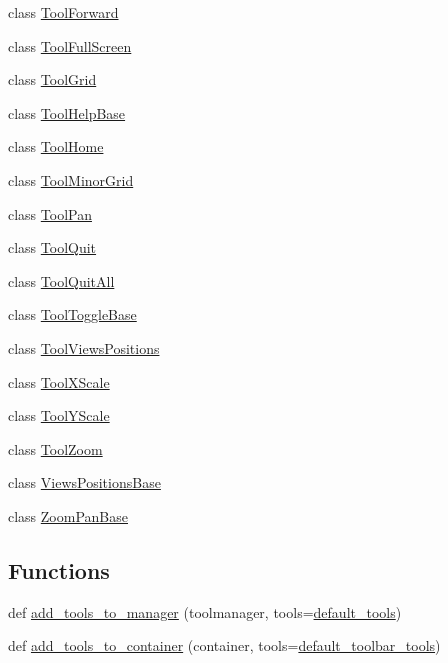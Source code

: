 \begin{DoxyCompactItemize}
\item 
class \hyperlink{classmatplotlib_1_1backend__tools_1_1ToolForward}{Tool\+Forward}
\item 
class \hyperlink{classmatplotlib_1_1backend__tools_1_1ToolFullScreen}{Tool\+Full\+Screen}
\item 
class \hyperlink{classmatplotlib_1_1backend__tools_1_1ToolGrid}{Tool\+Grid}
\item 
class \hyperlink{classmatplotlib_1_1backend__tools_1_1ToolHelpBase}{Tool\+Help\+Base}
\item 
class \hyperlink{classmatplotlib_1_1backend__tools_1_1ToolHome}{Tool\+Home}
\item 
class \hyperlink{classmatplotlib_1_1backend__tools_1_1ToolMinorGrid}{Tool\+Minor\+Grid}
\item 
class \hyperlink{classmatplotlib_1_1backend__tools_1_1ToolPan}{Tool\+Pan}
\item 
class \hyperlink{classmatplotlib_1_1backend__tools_1_1ToolQuit}{Tool\+Quit}
\item 
class \hyperlink{classmatplotlib_1_1backend__tools_1_1ToolQuitAll}{Tool\+Quit\+All}
\item 
class \hyperlink{classmatplotlib_1_1backend__tools_1_1ToolToggleBase}{Tool\+Toggle\+Base}
\item 
class \hyperlink{classmatplotlib_1_1backend__tools_1_1ToolViewsPositions}{Tool\+Views\+Positions}
\item 
class \hyperlink{classmatplotlib_1_1backend__tools_1_1ToolXScale}{Tool\+X\+Scale}
\item 
class \hyperlink{classmatplotlib_1_1backend__tools_1_1ToolYScale}{Tool\+Y\+Scale}
\item 
class \hyperlink{classmatplotlib_1_1backend__tools_1_1ToolZoom}{Tool\+Zoom}
\item 
class \hyperlink{classmatplotlib_1_1backend__tools_1_1ViewsPositionsBase}{Views\+Positions\+Base}
\item 
class \hyperlink{classmatplotlib_1_1backend__tools_1_1ZoomPanBase}{Zoom\+Pan\+Base}
\end{DoxyCompactItemize}
\subsection*{Functions}
\begin{DoxyCompactItemize}
\item 
def \hyperlink{namespacematplotlib_1_1backend__tools_a2ce533a44709b5460ac55ac37af7c4c4}{add\+\_\+tools\+\_\+to\+\_\+manager} (toolmanager, tools=\hyperlink{namespacematplotlib_1_1backend__tools_a8e5bd024d90b17a4841e51893bb2f2c8}{default\+\_\+tools})
\item 
def \hyperlink{namespacematplotlib_1_1backend__tools_a2179ca0a4641d1282f3076d4782f18eb}{add\+\_\+tools\+\_\+to\+\_\+container} (container, tools=\hyperlink{namespacematplotlib_1_1backend__tools_a5a62cc4cdc0d0dce97359b3133ef5113}{default\+\_\+toolbar\+\_\+tools})
\end{DoxyCompactItemize}
